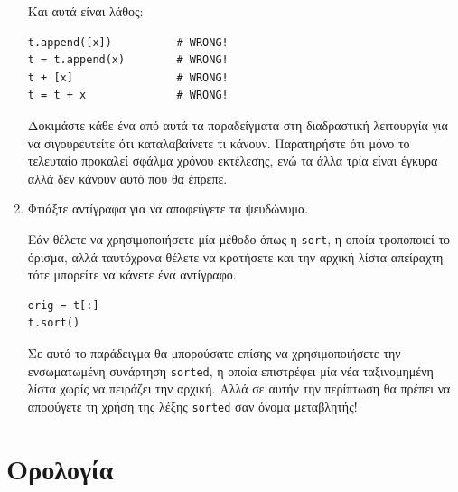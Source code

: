 \documentclass[10pt]{book}
\begin{document}
\begin{enumerate}
Και αυτά είναι λάθος:

\begin{verbatim}
t.append([x])          # WRONG!
t = t.append(x)        # WRONG!
t + [x]                # WRONG!
t = t + x              # WRONG!
\end{verbatim}

 
Δοκιμάστε κάθε ένα από αυτά τα παραδείγματα στη διαδραστική λειτουργία για να σιγουρευτείτε ότι καταλαβαίνετε τι κάνουν. Παρατηρήστε ότι μόνο το τελευταίο προκαλεί σφάλμα χρόνου εκτέλεσης, ενώ τα άλλα τρία είναι έγκυρα αλλά δεν κάνουν αυτό που θα έπρεπε.


\item  Φτιάξτε αντίγραφα για να αποφεύγετε τα ψευδώνυμα.

Εάν θέλετε να χρησιμοποιήσετε μία μέθοδο όπως η {\tt sort}, η οποία τροποποιεί το όρισμα, αλλά ταυτόχρονα θέλετε να κρατήσετε και την αρχική λίστα απείραχτη τότε μπορείτε να κάνετε ένα αντίγραφο.
 

\begin{verbatim}
orig = t[:]
t.sort()
\end{verbatim}

 
Σε αυτό το παράδειγμα θα μπορούσατε επίσης να χρησιμοποιήσετε την ενσωματωμένη συνάρτηση {\tt sorted}, η οποία επιστρέφει μία νέα ταξινομημένη λίστα χωρίς να πειράζει την αρχική. Αλλά σε αυτήν την περίπτωση θα πρέπει να αποφύγετε τη χρήση της λέξης {\tt sorted} σαν όνομα μεταβλητής!

\end{enumerate}


 
\section{Ορολογία}
\end{document}

